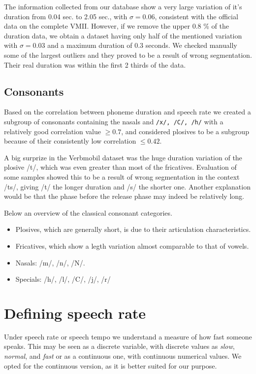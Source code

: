 \documentclass[a4paper]{scrreprt}
\begin{document}
The information collected from our database show a very large variation of it's duration from 0.04 sec. to 2.05 sec., with $\sigma = 0.06$, consistent with the official data on the complete VMII. However, if we remove the upper 0.8 \% of the duration data, we obtain a dataset having only half of the mentioned variation with $\sigma = 0.03$ and a maximum duration of 0.3 seconds. We checked manually some of the largest outliers and they proved to be a result of wrong segmentation. Their real duration was within the first 2 thirds of the data.

\section{Consonants}
Based on the correlation between phoneme duration and speech rate we created a subgroup of consonants containing the nasals and \texttt{/x/, /C/, /h/} with a relatively good correlation value $\geq 0.7$, and considered plosives to be a subgroup because of their consistently low correlation $\leq 0.42$.

A big surprize in the Verbmobil dataset was the huge duration variation of the plosive /t/, which was even greater than most of the fricatives. Evaluation of some samples showed this to be a result of wrong segmentation in the context /ts/, giving /t/ the longer duration and /s/ the shorter one. Another explanation would be that the phase before the release phase may indeed be relatively long.

Below an overview of the classical consonant categories.
\begin{itemize}
	\item Plosives, which are generally short, is due to their articulation characteristics.
	\item Fricatives, which show a legth variation almost comparable to that of vowels.
	\item Nasals: /m/, /n/, /N/.
	\item Specials: /h/, /l/, /C/, /j/, /r/
\end{itemize}


\chapter{Defining speech rate}
Under speech rate or speech tempo we understand a measure of how fast someone speaks. This may be seen as a discrete variable, with discrete values as \textit{slow}, \textit{normal}, and \textit{fast} or as a continuous one, with continuous numerical values.  We opted for the continuous version, as it is better suited for our purpose.
\end{document}
